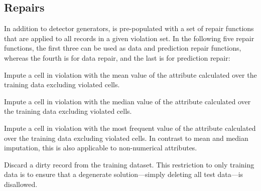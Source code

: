 \iffalse
    \subsection{Loader}
    The first step in using \sys is loading a dataset. \sys requires that that data is initially weakly structured, similar to the assumptions of SQLShare~\cite{howe2013sqlshare}. It assumes that each row corresponds to a record and attributes are delimited, but there are potentially missing values, the domain of possible attribute values are unknown, and the data types are unknown.
    We implemented a schema-on-read loading module that takes as input a SQL table, CSV, or a text file.
    This module returns a structured relation of tuples and inferred data types for each attribute (numerical, categorical, string, date, address).
    We designed the type inference to be soft--allowing for errors to exist in the dataset.
    The module automatically builds indices over the numerical and categorical attributes.
    These indices will help optimize the error detection module.
\fi



\subsection{Repairs}
In addition to detector generators, \sys is pre-populated with a set of repair functions that are applied to all records in a given violation set.  In the following five repair functions, the first three can be used as data and prediction repair functions,  whereas the fourth is for data repair, and the last is for prediction repair:

 Impute a cell in violation with the mean value of the attribute calculated over the training data excluding violated cells.


 Impute a cell in violation with the median value of the attribute calculated over the training data excluding violated cells.

 Impute a cell in violation with the most frequent value of the attribute calculated over the training data excluding violated cells.  In contrast to mean and median imputation, this is also applicable to non-numerical attributes.

 Discard a dirty record from the training dataset.  This restriction to only training data is to ensure that a degenerate solution---simply deleting all test data---is disallowed. 

